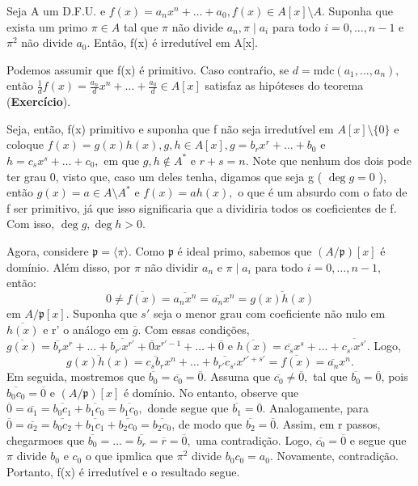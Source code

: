 \documentclass[algebraII_notes.tex]{subfiles}
\begin{document}
\begin{theorem*}
	Seja A um D.F.U. e \(f(x) = a_{n}x^{n} + \dotsc + a_{0}, f(x)\in A[x]\setminus{A}.\) Suponha que exista um primo \(\pi \in A\) tal que
	\(\pi \) não divide \(a_{n}, \pi \mid a_{i}\) para todo \(i=0, \dotsc , n-1\) e \(\pi^{2}\) não divide \(a_{0}\). Então, f(x) é irredutível em
	A[x].
\end{theorem*}
\begin{proof*}
	Podemos assumir que f(x) é primitivo. Caso contraŕio, se \(d = \mathrm{mdc}(a_{1}, \dotsc ,a_{n}),\) então
	\(\frac{1}{d}f(x) = \frac{a_{n}}{d}x^{n} + \dotsc + \frac{a_{0}}{d}\in A[x]\) satisfaz as hipóteses do teorema (\textbf{Exercício}).

	Seja, então, f(x) primitivo e suponha que f não seja irredutível em \(A[x]\setminus{\{0\}}\) e coloque
	\(f(x) = g(x)h(x), g, h\in A[x], g = b_{r}x^{r} + \dotsc  + b_{0}\) e \(h = c_{s}x^{s} + \dotsc +c_{0},\) em que
	\(g,h\not\in A^{*}\) e \(r+s = n.\) Note que nenhum dos dois pode ter grau 0, visto que, caso um deles tenha, digamos que seja g ( \(\deg{g} = 0\) ), então
	\(g(x)=a\in A\setminus{A^{*}}\) e \(f(x) = ah(x),\) o que é um absurdo com o fato de f ser primitivo, já que isso significaria que a dividiria todos os coeficientes
	de f. Com isso, \(\deg{g}, \deg{h} > 0.\)

	Agora, considere \(\mathfrak{p} = \langle \pi  \rangle.\) Como \(\mathfrak{p}\) é ideal primo, sabemos que
	\((A/\mathfrak{p})[x]\) é domínio. Além disso, por \(\pi \) não dividir \(a_{n}\) e \(\pi \mid a_{i}\) para todo \(i=0, \dotsc , n-1,\) então:
	\[
		0\neq \overline{f(x)} = \overline{a_{n}x^{n}} = \overline{a_{n}}x^{n} = \overline{g(x)h(x)}
	\]
	em \(A/\mathfrak{p}[x].\) Suponha que \(s'\) seja o menor grau com coeficiente não nulo em \(\overline{h(x)}\) e r' o análogo em \(\overline{g}.\)
	Com essas condições, \(\overline{g(x)} = \overline{b_{r}}x^{r} + \dotsc + \overline{b_{r'}x^{r'}} + \overline{0}x^{r'-1} + \dotsc + \overline{0}\) e
	\(\overline{h(x)} = \overline{c_{s}}x^{s} + \dotsc + \overline{c_{s'}x^{s'}}.\) Logo,
	\[
		\overline{g(x)h(x)} = \overline{c_{s}b_{r}}x^{n} + \dotsc + \overline{b_{r'}c_{s'}}x^{r'+s'} = \overline{f(x)} = \overline{a_{n}}x^{n}.
	\]
	Em seguida, mostremos que \(\overline{b_{0}} = \overline{c_{0}} = \overline{0}.\) Assuma que \(\overline{c_{0}}\neq \overline{0},\) tal que \(\overline{b_{0}}=\overline{0}\), pois
	\(\overline{b_{0}c_{0}} = \overline{0}\) e \((A/\mathfrak{p})[x]\) é domínio. No entanto, observe que \(\overline{0} = \overline{a_{1}} = \overline{b_{0}c_{1}} + \overline{b_{1}c_{0}} = \overline{b_{1}c_{0}},\)
	donde segue que \(\overline{b_{1}} = \overline{0}.\) Analogamente, para \(\overline{0} = \overline{a_{2}} = \overline{b_{0}c_{2}}+\overline{b_{1}c_{1}}+\overline{b_{2}c_{0}} = \overline{b_{2}c_{0}}\),
	de modo que \(\overline{b_{2}} = \overline{0}.\) Assim, em r passos, chegarmoes que \(\overline{b_{0}} = \dotsc = \overline{b_{r}} = \overline{r} = \overline{0},\) uma contradição.
	Logo, \(\overline{c_{0}} = \overline{0}\) e segue que \(\pi \) divide \(b_{0}\) e \(c_{0}\) o que ipmlica que \(\pi^{2}\) divide \(b_{0}c_{0} = a_{0}.\) Novamente,
	contradição. Portanto, f(x) é irredutível e o resultado segue. \qedsymbol
\end{proof*}
\end{document}
